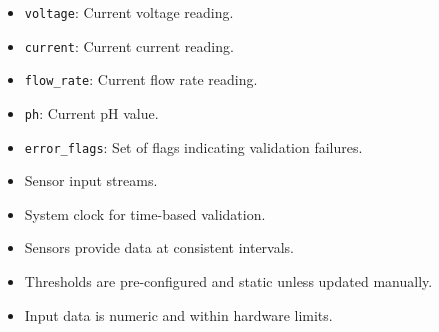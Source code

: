 \documentclass[12pt, titlepage]{article}
\begin{document}
\begin{description}
\begin{description}
\begin{description}
  \item[State Variables:]
  \item
    \begin{itemize}
      \item \lstinline{voltage}: Current voltage reading.
    \end{itemize}
    \item
    \begin{itemize}
      \item \lstinline{current}: Current current reading.
    \end{itemize}
    \item 
    \begin{itemize}
      \item \lstinline{flow_rate}: Current flow rate reading.
    \end{itemize}
    \item 
    \begin{itemize}
      \item \lstinline{ph}: Current pH value.
    \end{itemize}
    \item 
    \begin{itemize}
      \item \lstinline{error_flags}: Set of flags indicating validation failures.
    \end{itemize}

  \item[Environment Variables:]
  \item
    \begin{itemize}
      \item Sensor input streams.
    \end{itemize}
    \item
    \begin{itemize}
      \item System clock for time-based validation.
    \end{itemize}

  \item[Assumptions:]
  \item
    \begin{itemize}
      \item Sensors provide data at consistent intervals.
    \end{itemize}
    \item
    \begin{itemize}
      \item Thresholds are pre-configured and static unless updated manually.
    \end{itemize}
    \item 
    \begin{itemize}
      \item Input data is numeric and within hardware limits.
    \end{itemize}


\end{description}
\end{description}
\end{description}
\end{document}
